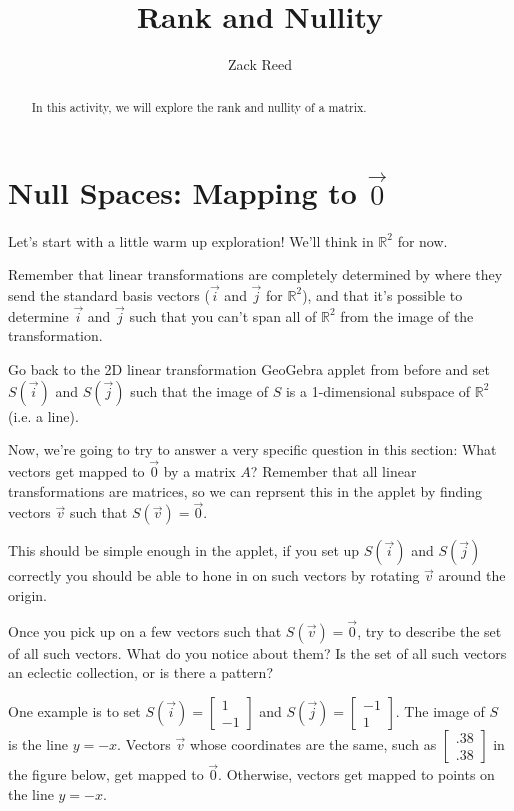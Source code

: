 \documentclass{ximera}
\author{Zack Reed}
\title{Rank and Nullity}
\begin{document}
\begin{abstract}

In this activity, we will explore the rank and nullity of a matrix.

\end{abstract}
\maketitle

\section*{Null Spaces: Mapping to $\vec{0}$}

\begin{exploration}

    Let's start with a little warm up exploration! We'll think in $\mathbb{R}^2$ for now.
    
    Remember that linear transformations are completely determined by where they send the standard basis vectors ($\vec{i}$ and $\vec{j}$ for $\mathbb{R}^2$), and that it's possible to determine $\vec{i}$ and $\vec{j}$ such that you can't span all of $\mathbb{R}^2$ from the image of the transformation.

    Go back to the 2D linear transformation GeoGebra applet from before and set $S(\vec{i})$ and $S(\vec{j})$ such that the image of $S$ is a 1-dimensional subspace of $\mathbb{R}^2$ (i.e. a line).
    

    Now, we're going to try to answer a very specific question in this section: What vectors get mapped to $\vec{0}$ by a matrix $A$? Remember that all linear transformations are matrices, so we can reprsent this in the applet by finding vectors $\vec{v}$ such that $S(\vec{v})=\vec{0}$.

    This should be simple enough in the applet, if you set up $S(\vec{i})$ and $S(\vec{j})$ correctly you should be able to hone in on such vectors by rotating $\vec{v}$ around the origin.

    Once you pick up on a few vectors such that $S(\vec{v})=\vec{0}$, try to describe the set of all such vectors. What do you notice about them? Is the set of all such vectors an eclectic collection, or is there a pattern?

    \begin{solution}

        One example is to set $S(\vec{i})=\begin{bmatrix} 1 \\ -1 \end{bmatrix}$ and $S(\vec{j})=\begin{bmatrix} -1 \\ 1 \end{bmatrix}$. The image of $S$ is the line $y=-x$. Vectors $\vec{v}$ whose coordinates are the same, such as $\begin{bmatrix} .38 \\ .38 \end{bmatrix}$ in the figure below, get mapped to $\vec{0}$. Otherwise, vectors get mapped to points on the line $y=-x$. 


\end{solution}
\end{exploration}
\end{document}
